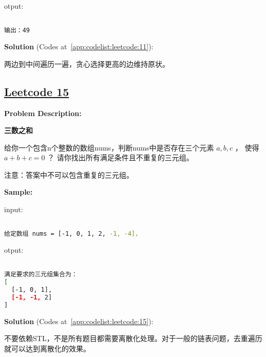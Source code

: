 otput:\par

\begin{lstlisting}[language=bash]

输出：49


\end{lstlisting}

\textbf{Solution }(Codes at~\ref{app:codelist:leetcode:11}):\par

两边到中间遍历一遍，贪心选择更高的边维持原状。\par



\subsection{\href{https://leetcode-cn.com/}{Leetcode 15}}\label{app:problemlist:leetcode:15}

\textbf{Problem Description:}\par

\textbf{三数之和}\par

给你一个包含n个整数的数组nums，判断nums中是否存在三个元素 $ a, b, c $ ，
使得 $ a + b + c = 0 $ ？
请你找出所有满足条件且不重复的三元组。\par

注意：答案中不可以包含重复的三元组。\par


\textbf{Sample:}\par

input:\par

\begin{lstlisting}[language=bash]

给定数组 nums = [-1, 0, 1, 2, -1, -4]，


\end{lstlisting}

otput:\par

\begin{lstlisting}[language=bash]

满足要求的三元组集合为：
[
  [-1, 0, 1],
  [-1, -1, 2]
]


\end{lstlisting}

\textbf{Solution }(Codes at~\ref{app:codelist:leetcode:15}):\par

不要依赖STL，不是所有题目都需要离散化处理。对于一般的链表问题，去重遍历就可以达到离散化的效果。\par

